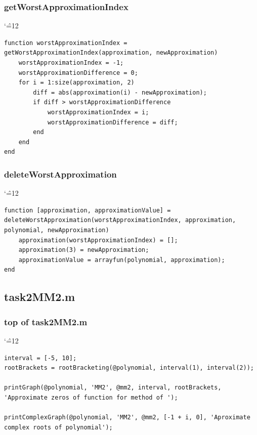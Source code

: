 \documentclass[12pt]{report}
\newenvironment{simplechar}{%
   \catcode`\^=12
}{}
\begin{document}
\subsubsection{getWorstApproximationIndex}
\begin{simplechar}
\begin{lstlisting}
function worstApproximationIndex = getWorstApproximationIndex(approximation, newApproximation)
    worstApproximationIndex = -1;
    worstApproximationDifference = 0;
    for i = 1:size(approximation, 2)
        diff = abs(approximation(i) - newApproximation);
        if diff > worstApproximationDifference
            worstApproximationIndex = i;
            worstApproximationDifference = diff;
        end
    end
end
\end{lstlisting}
\end{simplechar}

\subsubsection{deleteWorstApproximation}
\begin{simplechar}
\begin{lstlisting}
function [approximation, approximationValue] = deleteWorstApproximation(worstApproximationIndex, approximation, polynomial, newApproximation)
    approximation(worstApproximationIndex) = [];
    approximation(3) = newApproximation;
    approximationValue = arrayfun(polynomial, approximation);
end
\end{lstlisting}
\end{simplechar}

\newpage
\subsection{task2MM2.m}


\subsubsection{top of task2MM2.m}
\begin{simplechar}
\begin{lstlisting}
interval = [-5, 10];
rootBrackets = rootBracketing(@polynomial, interval(1), interval(2));

printGraph(@polynomial, 'MM2', @mm2, interval, rootBrackets, 'Approximate zeros of function for method of ');

printComplexGraph(@polynomial, 'MM2', @mm2, [-1 + i, 0], 'Aproximate complex roots of polynomial');
\end{lstlisting}
\end{simplechar}
\end{document}
